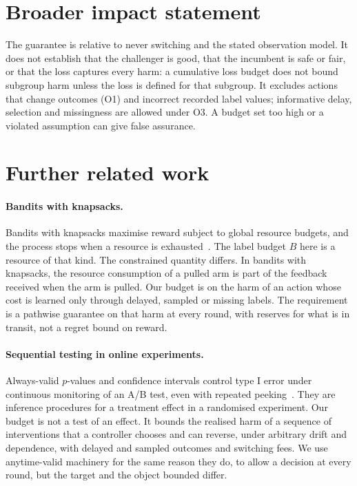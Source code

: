 \documentclass[10pt]{article}
\theoremstyle{plain}
\theoremstyle{definition}
\begin{document}
\section*{Broader impact statement}
The guarantee is relative to never switching and the stated observation model. It does not establish that the challenger is good, that the incumbent is safe or fair, or that the loss captures every harm: a cumulative loss budget does not bound subgroup harm unless the loss is defined for that subgroup. It excludes actions that change outcomes (O1) and incorrect recorded label values; informative delay, selection and missingness are allowed under O3. A budget set too high or a violated assumption can give false assurance.




\appendix
\section{Further related work}\label{app:relwork}
\paragraph{Bandits with knapsacks.}
Bandits with knapsacks maximise reward subject to global resource budgets, and the process stops when a resource is exhausted~\citep{badanidiyuru2013bandits,badanidiyuru2018bandits}. The label budget $B$ here is a resource of that kind. The constrained quantity differs. In bandits with knapsacks, the resource consumption of a pulled arm is part of the feedback received when the arm is pulled. Our budget is on the harm of an action whose cost is learned only through delayed, sampled or missing labels. The requirement is a pathwise guarantee on that harm at every round, with reserves for what is in transit, not a regret bound on reward.

\paragraph{Sequential testing in online experiments.}
Always-valid $p$-values and confidence intervals control type I error under continuous monitoring of an A/B test, even with repeated peeking~\citep{johari2017peeking,johari2022always}. They are inference procedures for a treatment effect in a randomised experiment. Our budget is not a test of an effect. It bounds the realised harm of a sequence of interventions that a controller chooses and can reverse, under arbitrary drift and dependence, with delayed and sampled outcomes and switching fees. We use anytime-valid machinery for the same reason they do, to allow a decision at every round, but the target and the object bounded differ.
\end{document}
